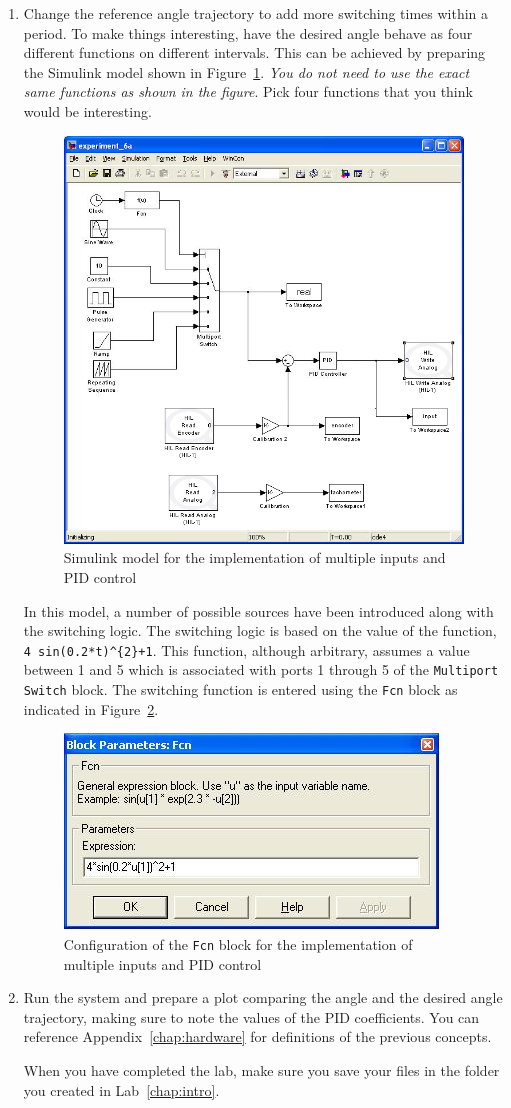 \begin{enumerate}
\item Change the reference angle trajectory to add more switching times
within a period.  To make things interesting, have the desired angle behave
as four different functions on different intervals.  This can be achieved by 
preparing the \textsf{Simulink} model shown in Figure~\ref{fig:multiSwitch}\@. 
\emph{You do not need to use the exact same functions as shown in the figure}. Pick 
four functions that you think would be interesting. 
\begin{figure}[htbp]
\centering
\includegraphics[width=0.6\hsize]{pix/lab6b.jpg}
\caption{\textsf{Simulink} model for the implementation of multiple inputs and PID control}\label{fig:multiSwitch}
\end{figure}%
In this model, a number of possible sources have been introduced along with
the switching logic.  The switching logic is based on the value of the
function, \verb|4 sin(0.2*t)^{2}+1|.  This function, although arbitrary,
assumes a value between 1 and 5 which is associated with ports 1 through 5 of
the \verb|Multiport Switch| block.  The switching function is entered using
the \verb|Fcn| block as indicated in Figure~\ref{fig:switchConfig}\@.
\begin{figure}[htbp]
\centering
\includegraphics[width=0.6\hsize]{pix/fcnParameters.jpg}
\caption{Configuration of the \texttt{Fcn} block for the implementation of multiple inputs and PID control}\label{fig:switchConfig}
\end{figure}%

\item Run the system and prepare a plot comparing the angle and the desired angle
trajectory, making sure to note the values of the PID coefficients. You can
reference Appendix~\ref{chap:hardware} for definitions of the previous
concepts.

When you have completed the lab, make sure you save your files in the folder
you created in Lab~\ref{chap:intro}\@.

\end{enumerate}


